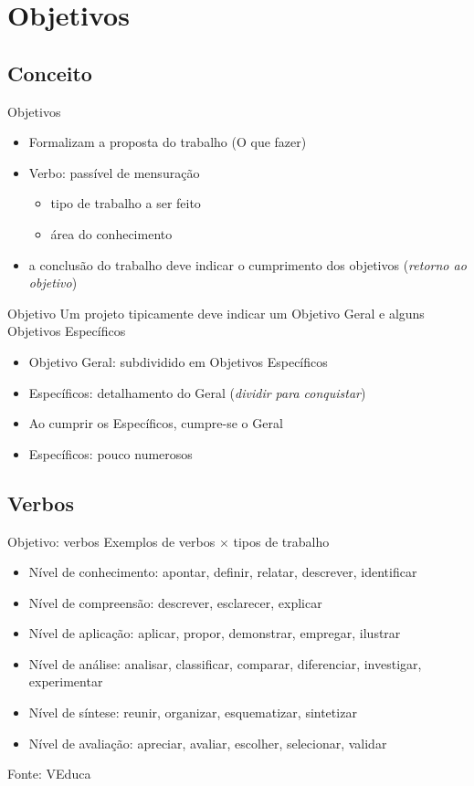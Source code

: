 \documentclass{beamer}
\begin{document}
\section{Objetivos}

\subsection{Conceito}

\begin{frame}{Objetivos}
  \begin{itemize}
  \item Formalizam a proposta do trabalho (\alert{O que} fazer)
  \item \alert{Verbo}: passível de mensuração
    \begin{itemize}
    \item tipo de trabalho a ser feito
    \item área do conhecimento
    \end{itemize}
    \item a conclusão do trabalho deve indicar o cumprimento dos
      objetivos ({\em retorno ao objetivo})
  \end{itemize}
\end{frame}

\begin{frame}{Objetivo}
  Um projeto tipicamente deve indicar um Objetivo Geral e alguns
  Objetivos Específicos
  \begin{itemize}
  \item Objetivo Geral: subdividido em Objetivos Específicos
  \item Específicos: detalhamento do Geral ({\em dividir para conquistar})
  \item Ao cumprir os Específicos, cumpre-se o Geral
  \item Específicos: pouco numerosos
  \end{itemize}
\end{frame}

\subsection{Verbos}

\begin{frame}{Objetivo: verbos}
  Exemplos de verbos $\times$ tipos de trabalho
  \begin{itemize}
  \item Nível de conhecimento: apontar, definir, relatar, descrever,
    identificar
  \item Nível de compreensão: descrever, esclarecer, explicar
  \item Nível de aplicação: aplicar, propor, demonstrar, empregar, ilustrar
  \item Nível de análise: analisar, classificar, comparar,
    diferenciar, investigar, experimentar
  \item Nível de síntese: reunir, organizar, esquematizar, sintetizar
  \item Nível de avaliação: apreciar, avaliar, escolher, selecionar, validar
  \end{itemize}

  Fonte: VEduca
\end{frame}
\end{document}
